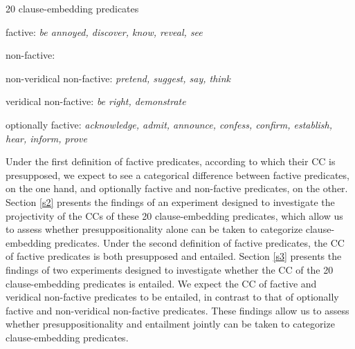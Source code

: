 \documentclass[11pt,fleqn]{article}
\newcommand{\6}{\mbox{$[\hspace*{-.6mm}[$}}
\newcommand{\9}{\mbox{$]\hspace*{-.6mm}]$}}
\begin{document}
\begin{exe}
\ex\label{pred} 20 clause-embedding predicates 

\begin{xlist}

\ex factive: {\em be annoyed, discover, know, reveal, see}

\ex non-factive:

\begin{xlist}

\ex non-veridical non-factive: {\em pretend, suggest, say, think}

\ex veridical non-factive: {\em be right, demonstrate}

\end{xlist}

\ex optionally factive: {\em acknowledge, admit, announce, confess, confirm, establish, hear, inform, prove}

\end{xlist}

\end{exe}

Under the first definition of factive predicates, according to which their CC is presupposed, we expect to see a categorical difference between factive predicates, on the one hand, and optionally factive and non-factive predicates, on the other. Section \ref{s2} presents the findings of an experiment designed to investigate the projectivity of the CCs of these 20 clause-embedding predicates, which allow us to assess whether presuppositionality alone can be taken to categorize clause-embedding predicates. Under the second definition of factive predicates, the CC of factive predicates is both presupposed and entailed. Section \ref{s3} presents the findings of two experiments designed to investigate whether the CC of the 20 clause-embedding predicates is entailed. We expect the CC of factive and veridical non-factive predicates to be entailed, in contrast to that of optionally factive and non-veridical non-factive predicates. These findings allow us to assess whether presuppositionality and entailment jointly can be taken to categorize clause-embedding predicates. 


\end{document}
